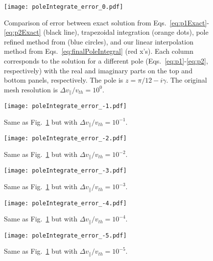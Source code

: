 \begin{figure}[!htb]
	\texttt{[image: poleIntegrate\_error\_0.pdf]}
	\caption{Comparison of error between exact solution from Eqs.~\ref{eq:p1Exact}-\ref{eq:p2Exact} (black line),
		trapezoidal integration (orange dots),
		pole refined method from \cite{longley2024} (blue circles),
		and our linear interpolation method from Eqs.~\ref{eq:finalPoleIntegral} (red x's).
		Each column corresponds to the solution for a different pole (Eqs.~\ref{eq:p1}-\ref{eq:p2}, respectively)
		with the real and imaginary parts on the top and bottom panels, respectively.
		The pole is $z=\pi/12-i\gamma$.
		The original mesh resolution is $\Delta v_\parallel/v_{th}=10^0$.}
	\label{f:poleIntegrateError0}
\end{figure}

\begin{figure}[!htb]
	\texttt{[image: poleIntegrate\_error\_-1.pdf]}
	\caption{Same as Fig.~\ref{f:poleIntegrateError0} but with $\Delta v_\parallel/v_{th}=10^{-1}$.}
	\label{f:poleIntegrateError-1}
\end{figure}

\begin{figure}[!htb]
	\texttt{[image: poleIntegrate\_error\_-2.pdf]}
	\caption{Same as Fig.~\ref{f:poleIntegrateError0} but with $\Delta v_\parallel/v_{th}=10^{-2}$.}
	\label{f:poleIntegrateError-2}
\end{figure}

\begin{figure}[!htb]
	\texttt{[image: poleIntegrate\_error\_-3.pdf]}
	\caption{Same as Fig.~\ref{f:poleIntegrateError0} but with $\Delta v_\parallel/v_{th}=10^{-3}$.}
	\label{f:poleIntegrateError-3}
\end{figure}

\begin{figure}[!htb]
	\texttt{[image: poleIntegrate\_error\_-4.pdf]}
	\caption{Same as Fig.~\ref{f:poleIntegrateError0} but with $\Delta v_\parallel/v_{th}=10^{-4}$.}
	\label{f:poleIntegrateError-4}
\end{figure}

\begin{figure}[!htb]
	\texttt{[image: poleIntegrate\_error\_-5.pdf]}
	\caption{Same as Fig.~\ref{f:poleIntegrateError0} but with $\Delta v_\parallel/v_{th}=10^{-5}$.}
	\label{f:poleIntegrateError-5}
\end{figure}

